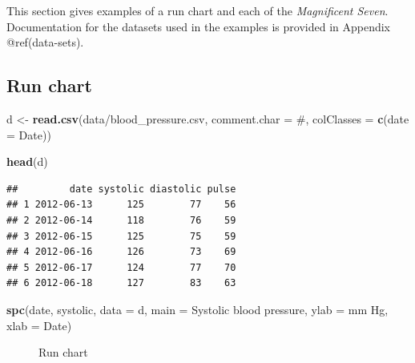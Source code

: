 \documentclass[
]{book}
\makeatletter
\newenvironment{Shaded}{\begin{snugshade}}{\end{snugshade}}
\newcommand{\AttributeTok}[1]{\textcolor[rgb]{0.13,0.29,0.53}{#1}}
\newcommand{\FunctionTok}[1]{\textcolor[rgb]{0.13,0.29,0.53}{\textbf{#1}}}
\newcommand{\NormalTok}[1]{#1}
\newcommand{\OtherTok}[1]{\textcolor[rgb]{0.56,0.35,0.01}{#1}}
\newcommand{\StringTok}[1]{\textcolor[rgb]{0.31,0.60,0.02}{#1}}
\newcommand*\pandocbounded[1]{%
  \sbox\pandoc@box{#1}%
  \Gscale@div\@tempa{\textheight}{\dimexpr\ht\pandoc@box+\dp\pandoc@box\relax}%
  \Gscale@div\@tempb{\linewidth}{\wd\pandoc@box}%
  \ifdim\@tempb\p@<\@tempa\p@\let\@tempa\@tempb\fi%
  \ifdim\@tempa\p@<\p@\scalebox{\@tempa}{\usebox\pandoc@box}%
  \else\usebox{\pandoc@box}%
  \fi%
}
\makeatother
\begin{document}
This section gives examples of a run chart and each of the
\emph{Magnificent Seven}. Documentation for the datasets used in the
examples is provided in Appendix @ref(data-sets).

\subsection{Run chart}\label{run-chart}

\begin{Shaded}
\begin{Highlighting}[]
\NormalTok{d }\OtherTok{\textless{}{-}} \FunctionTok{read.csv}\NormalTok{(}\StringTok{\textquotesingle{}data/blood\_pressure.csv\textquotesingle{}}\NormalTok{,}
              \AttributeTok{comment.char =} \StringTok{\textquotesingle{}\#\textquotesingle{}}\NormalTok{,}
              \AttributeTok{colClasses   =} \FunctionTok{c}\NormalTok{(}\AttributeTok{date =} \StringTok{\textquotesingle{}Date\textquotesingle{}}\NormalTok{))}

\FunctionTok{head}\NormalTok{(d)}
\end{Highlighting}
\end{Shaded}

\begin{verbatim}
##         date systolic diastolic pulse
## 1 2012-06-13      125        77    56
## 2 2012-06-14      118        76    59
## 3 2012-06-15      125        75    59
## 4 2012-06-16      126        73    69
## 5 2012-06-17      124        77    70
## 6 2012-06-18      127        83    63
\end{verbatim}

\begin{Shaded}
\begin{Highlighting}[]
\FunctionTok{spc}\NormalTok{(date, systolic,}
    \AttributeTok{data =}\NormalTok{ d,}
    \AttributeTok{main =} \StringTok{\textquotesingle{}Systolic blood pressure\textquotesingle{}}\NormalTok{,}
    \AttributeTok{ylab =} \StringTok{\textquotesingle{}mm Hg\textquotesingle{}}\NormalTok{,}
    \AttributeTok{xlab =} \StringTok{\textquotesingle{}Date\textquotesingle{}}\NormalTok{)}
\end{Highlighting}
\end{Shaded}

\begin{figure}
\centering
\pandocbounded{}
\caption{Run chart}
\end{figure}
\end{document}
